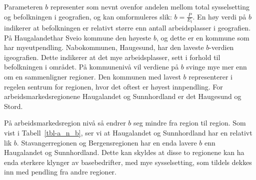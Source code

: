 \documentclass[
]{article}
\begin{document}
Parameteren \(b\) representer som nevnt ovenfor andelen mellom total
sysselsetting og befolkningen i geografien, og kan omformuleres slik:
\(b = \frac{P}{E_t}\). En høy verdi på \(b\) indikerer at befolkningen
er relativt større enn antall arbeidsplasser i geografien. På
Haugalandethar Sveio kommune den høyeste \(b\), og dette er en kommune
som har myeutpendling. Nabokommunen, Haugesund, har den laveste
\(b\)-verdien igeografien. Dette indikerer at det mye arbeidsplasser,
sett i forhold til befolkningen i området. På kommunenivå vil verdiene
på \(b\) svinge mye mer enn om en sammenligner regioner. Den kommunen
med lavest \(b\) representerer i regelen sentrum for regionen, hvor det
oftest er høyest innpendling. For arbeidsmarkedsregionene Haugalandet og
Sunnhordland er det Haugesund og Stord.

På arbeidsmarkedsregion nivå så endrer \(b\) seg mindre fra region til
region. Som vist i Tabell~\ref{tbl-a_n_b}, ser vi at Haugalandet og
Sunnhordland har en relativt lik \(b\). Stavangerregionen og
Bergensregionen har en enda lavere \(b\) enn Haugalandet og
Sunnhordland. Dette kan skyldes at disse to regionene kan ha enda
sterkere klynger av basebedrifter, med mye sysselsetting, som tildels
dekkes inn med pendling fra andre regioner.
\end{document}
